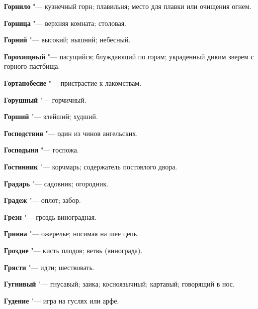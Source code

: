 \begin{mymulticols}{2}
\noindent\textbf{Горнило} "--- кузнечный горн; плавильня; место для плавки или очищения огнем. 




\noindent\textbf{Горница} "--- верхняя комната; столовая. 




\noindent\textbf{Горний} "--- высокий; вышний; небесный. 




\noindent\textbf{Горохищный} "--- пасущийся; блуждающий по горам; украденный диким зверем с горного пастбища. 




\noindent\textbf{Гортанобесие} "--- пристрастие к лакомствам. 




\noindent\textbf{Горушный} "--- горчичный. 




\noindent\textbf{Горший} "--- злейший; худший. 




\noindent\textbf{Господствия} "--- один из чинов ангельских. 




\noindent\textbf{Господыня} "--- госпожа. 




\noindent\textbf{Гостинник} "--- корчмарь; содержатель постоялого двора. 




\noindent\textbf{Градарь} "--- садовник; огородник. 




\noindent\textbf{Градеж} "--- оплот; забор. 




\noindent\textbf{Грезн} "--- гроздь виноградная. 




\noindent\textbf{Гривна} "--- ожерелье; носимая на шее цепь. 




\noindent\textbf{Гроздие} "--- кисть плодов; ветвь (винограда). 




\noindent\textbf{Грясти} "--- идти; шествовать. 




\noindent\textbf{Гугнивый} "--- гнусавый; заика; косноязычный; картавый; говорящий в нос. 




\noindent\textbf{Гудение} "--- игра на гуслях или арфе. 





\end{mymulticols}
